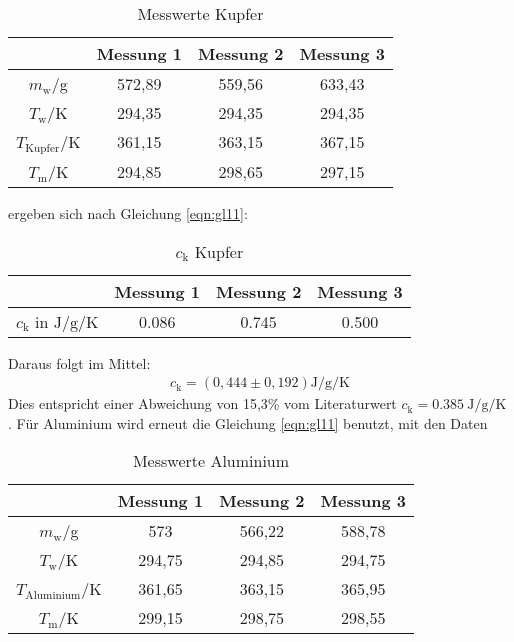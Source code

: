 \begin{table}
  \centering
  \caption{Messwerte Kupfer}
  \label{tab:WerteKupfer}
  \begin{tabular}{c c c c}
   \toprule
   & Messung 1 & Messung 2 & Messung 3 \\
   \midrule
   $m_\text{w}$/g & 572,89 & 559,56 & 633,43 \\
   $T_\text{w}$/K & 294,35 & 294,35 & 294,35 \\
   $T_\text{Kupfer}$/K & 361,15 & 363,15 & 367,15 \\
   $T_\text{m}$/K & 294,85 & 298,65 & 297,15 \\
   \bottomrule
  \end{tabular}
\end{table}
\FloatBarrier
\noindent
ergeben sich nach Gleichung \eqref{eqn:gl11}:
\begin{table}
  \centering
  \caption{$c_\text{k}$ Kupfer}
  \label{tab:ckKupfer}
  \begin{tabular}{c c c c}
   \toprule
   & Messung 1 & Messung 2 & Messung 3 \\
   \midrule
   $c_\text{k}$ in $\si{\joule\per\gram\per\kelvin}$ & 0.086 & 0.745 & 0.500 \\
   \bottomrule
  \end{tabular}
\end{table}
\FloatBarrier
\noindent
Daraus folgt im Mittel:
\begin{align*}
  c_\text{k} = \left(0,444 \pm 0,192 \right) \si{\joule\per\gram\per\kelvin}
\end{align*}
Dies entspricht einer Abweichung von 15,3\% vom Literaturwert $c_\text{k} = \SI{0,385}{\joule\per\gram\per\kelvin}$ \cite{Wkappa}.
\noindent
Für Aluminium wird erneut die Gleichung \eqref{eqn:gl11} benutzt, mit den Daten
\begin{table}
  \centering
  \caption{Messwerte Aluminium}
  \label{tab:WerteAluminium}
  \begin{tabular}{c c c c}
   \toprule
   & Messung 1 & Messung 2 & Messung 3 \\
   \midrule
   $m_\text{w}$/g & 573 & 566,22 & 588,78 \\
   $T_\text{w}$/K & 294,75 & 294,85 & 294,75 \\
   $T_\text{Aluminium}$/K & 361,65 & 363,15 & 365,95 \\
   $T_\text{m}$/K & 299,15 & 298,75 & 298,55 \\
   \bottomrule
  \end{tabular}
\end{table}
